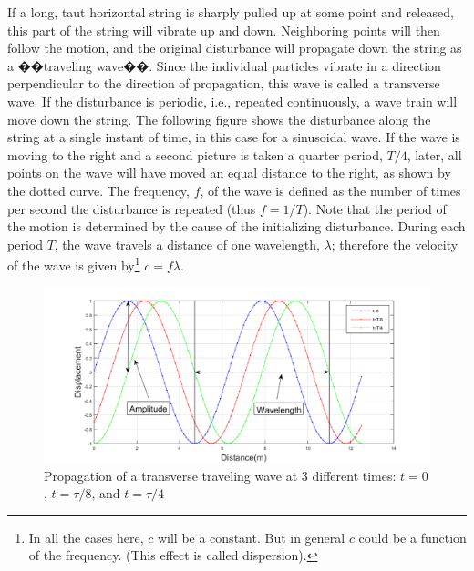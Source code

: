If a long, taut horizontal string is sharply pulled up at some point and released, this part of the string will vibrate up and down. Neighboring points will then follow the motion, and the original disturbance will propagate down the string as a ��traveling wave��. Since the individual particles vibrate in a direction perpendicular to the direction of propagation, this wave is called a transverse wave. If the disturbance is periodic, i.e., repeated continuously, a wave train will move down the string. The following figure shows the disturbance along the string at a single instant of time, in this case for a sinusoidal wave. If the wave is moving to the right and a second picture is taken a quarter period, $T/4$, later, all points on the wave will have moved an equal distance to the right, as shown by the dotted curve. The frequency, $f$, of the wave is defined as the number of times per second the disturbance is repeated (thus $f = 1 / T$). Note that the period of the motion is determined by the cause of the initializing disturbance. During each period $T$, the wave travels a distance of one wavelength, $\lambda$; therefore the velocity of the wave is given by\footnote{In all the cases here, $c$ will be a constant. But in general $c$ could be a function of the frequency. (This effect is called dispersion).} $c=f\lambda$.\myskip
\begin{figure}[h]
\centering
\includegraphics[width=1.0\textwidth]{./Exp1-9/pic/page01.png}
\caption{Propagation of a transverse traveling wave at 3 different times: $t=0$, $t=\tau/8$, and $t=\tau/4$}
\end{figure}


